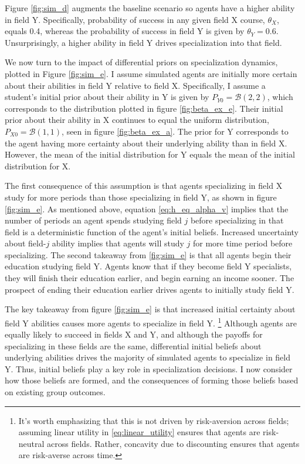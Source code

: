 \documentclass[10 pt]{article}
\newcommand{\toedit}[1]{{\color{gray}#1}}
\newcommand{\toedit}[1]{#1}
\begin{document}
Figure \ref{fig:sim_d} augments the baseline scenario so agents have a higher ability in field Y. 
Specifically, probability of success in any given field X course, $\theta_X$, equals 0.4, whereas the probability of success in field Y is given by $\theta_Y = 0.6$. 
Unsurprisingly, a higher ability in field Y drives specialization into that field.

We now turn to the impact of differential priors on specialization dynamics, plotted in Figure \ref{fig:sim_e}.
I assume simulated agents are initially more certain about their abilities in field Y relative to field X.
Specifically, I assume a student's initial prior about their ability in Y is given by $P_{Y0} = \mathcal{B} (2, 2)$, which corresponds to the distribution plotted in figure \ref{fig:beta_ex_e}.
Their initial prior about their ability in X continues to equal the uniform distribution, $P_{X0} = \mathcal{B} (1, 1)$, seen in figure \ref{fig:beta_ex_a}.
The prior for Y corresponds to the agent having more certainty about their underlying ability than in field X. 
However, the mean of the initial distribution for Y equals the mean of the initial distribution for X.

The first consequence of this assumption is that agents specializing in field X study for more periods than those specializing in field Y, as shown in figure \ref{fig:sim_e}.
As mentioned above, equation \eqref{eq:h_eq_alpha_v} implies that the number of periods an agent spends studying field $j$ before specializing in that field is a deterministic function of the agent's initial beliefs.
Increased uncertainty about field-$j$ ability implies that agents will study $j$ for more time period before specializing. 
\toedit{The second takeaway from \ref{fig:sim_e} is that all agents begin their education studying field Y.}
Agents know that if they become field Y specialists, they will finish their education earlier, and begin earning an income sooner.
The prospect of ending their education earlier drives agents to initially study field Y.

\toedit{The key takeaway from figure \ref{fig:sim_e} is that increased initial certainty about field Y abilities causes more agents to specialize in field Y.
\footnote{
    It's worth emphasizing that this is not driven by risk-aversion across fields;
    \toedit{assuming linear utility in \eqref{eq:linear_utility} ensures that agents are risk-neutral across fields.}
    Rather, \toedit{concavity due to discounting ensures that agents are risk-averse across time.}
}}
Although agents are equally likely to succeed in fields X and Y, and although the payoffs for specializing in these fields are the same, differential initial beliefs about underlying abilities drives the majority of simulated agents to specialize in field Y.
Thus, initial beliefs play a key role in specialization decisions. 
\toedit{I now consider how those beliefs are formed, and the consequences of forming those beliefs based on existing group outcomes.}
\end{document}
